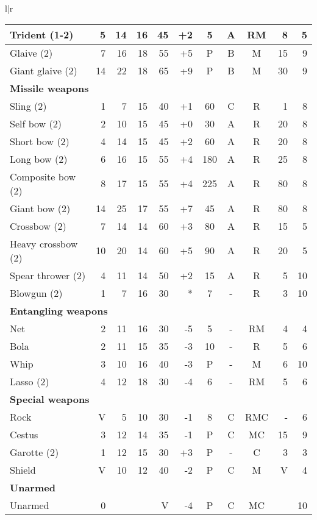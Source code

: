 \begin{tabular}[t]{l|r}
\begin{minipage}[t]{4.7in}
\begin{tabularx}{\linewidth}[t]{Xrrrrrcccrr}
Trident (1-2)	& 5	& 14	& 16	& 45	& +2	& 5	& A	& RM	& 8	& 5 \\ \hline
Glaive (2)	& 7	& 16	& 18	& 55	& +5	& P	& B	& M	& 15	& 9 \\ \hline
Giant glaive (2)\footnotemark[2]& 14	& 22	& 18	& 65	& +9	& P	& B	& M	& 30	& 9 \\ \hline
\multicolumn{11}{l}{\textbf{Missile weapons}\footnotemark} \\ \hline
Sling (2)	& 1	& 7	& 15	& 40	& +1	& 60	& C	& R	& 1	& 8 \\ \hline
Self bow (2)	& 2	& 10	& 15	& 45	& +0	& 30	& A	& R	& 20	& 8 \\ \hline
Short bow (2)	& 4	& 14	& 15	& 45	& +2	& 60	& A	& R	& 20	& 8 \\ \hline
Long bow (2)\footnotemark	& 6	& 16	& 15	& 55	& +4	& 180	& A	& R	& 25	& 8 \\ \hline
Composite bow (2)& 8	& 17	& 15	& 55	& +4	& 225	& A	& R	& 80	& 8 \\ \hline
Giant bow (2)\footnotemark[2]	& 14	& 25	& 17	& 55	& +7	& 45	& A	& R	& 80	& 8 \\ \hline
Crossbow (2)	& 7	& 14	& 14	& 60	& +3	& 80	& A	& R	& 15	& 5 \\ \hline
Heavy crossbow (2)& 10	& 20	& 14	& 60	& +5	& 90	& A	& R	& 20	& 5 \\ \hline
Spear thrower (2)& 4	& 11	& 14	& 50	& +2	& 15	& A	& R	& 5	& 10 \\ \hline
Blowgun (2)	& 1	& 7	& 16	& 30	& *	& 7	& -	& R	& 3	& 10 \\ \hline
\multicolumn{11}{l}{\textbf{Entangling weapons}} \\ \hline
Net\footnotemark & 2	& 11	& 16	& 30	& -5	& 5	& -	& RM	& 4	& 4 \\ \hline
Bola\footnotemark[14] & 2	& 11	& 15	& 35	& -3	& 10	& -	& R	& 5	& 6 \\ \hline
Whip\footnotemark[14]\footnotemark & 3	& 10	& 16	& 40	& -3	& P	& -	& M	& 6	& 10 \\ \hline
Lasso (2)	& 4	& 12	& 18	& 30	& -4	& 6	& -	& RM	& 5	& 6 \\ \hline
\multicolumn{11}{l}{\textbf{Special weapons}} \\ \hline
Rock		& V	& 5	& 10	& 30	& -1	& 8	& C	& RMC	& -	& 6 \\ \hline
Cestus\footnotemark & 3	& 12	& 14	& 35	& -1	& P	& C	& MC	& 15	& 9 \\ \hline
Garotte (2)\footnotemark & 1	& 12	& 15	& 30	& +3	& P	& -	& C	& 3	& 3 \\ \hline
Shield		& V	& 10	& 12	& 40	& -2	& P	& C	& M	& V	& 4 \\ \hline
\multicolumn{11}{l}{\textbf{Unarmed}} \\ \hline
Unarmed\footnotemark	& 0	&	&	& V	& -4	& P	& C	& MC	& & 10 \\ \hline 
\end{tabularx}
\end{minipage}
\end{tabular}

